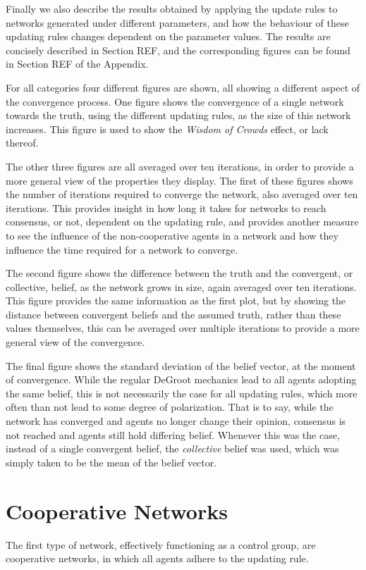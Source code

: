 \documentclass[a4paper, 12pt]{report}
\begin{document}
Finally we also describe the results obtained by applying the update rules to networks generated under different parameters, and how the behaviour of these updating rules changes dependent on the parameter values. The results are concisely described in Section REF, and the corresponding figures can be found in Section REF of the Appendix.

For all categories four different figures are shown, all showing a different aspect of the convergence process. One figure shows the convergence of a single network towards the truth, using the different updating rules, as the size of this network increases. This figure is used to show the \emph{Wisdom of Crowds} effect, or lack thereof. 

The other three figures are all averaged over ten iterations, in order to provide a more general view of the properties they display. The first of these figures shows the number of iterations required to converge the network, also averaged over ten iterations. This provides insight in how long it takes for networks to reach consensus, or not, dependent on the updating rule, and provides another measure to see the influence of the non-cooperative agents in a network and how they influence the time required for a network to converge.

The second figure shows the difference between the truth and the convergent, or collective, belief, as the network grows in size, again averaged over ten iterations. This figure provides the same information as the first plot, but by showing the distance between convergent beliefs and the assumed truth, rather than these values themselves, this can be averaged over multiple iterations to provide a more general view of the convergence.

The final figure shows the standard deviation of the belief vector, at the moment of convergence. While the regular DeGroot mechanics lead to all agents adopting the same belief, this is not necessarily the case for all updating rules, which more often than not lead to some degree of polarization. That is to say, while the network has converged and agents no longer change their opinion, consensus is not reached and agents still hold differing belief. Whenever this was the case, instead of a single convergent belief, the \emph{collective} belief was used, which was simply taken to be the mean of the belief vector.

\newpage

\section{Cooperative Networks}
\label{results:coop}
The first type of network, effectively functioning as a control group, are cooperative networks, in which all agents adhere to the updating rule. 
\end{document}
